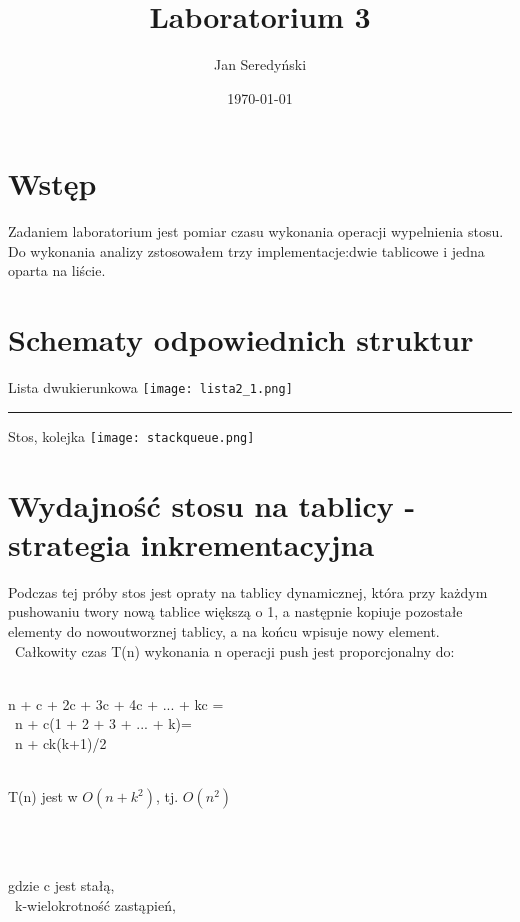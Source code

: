 \documentclass[11pt]{article}
\begin{document}
\title{Laboratorium 3}
\author{Jan Seredyński}
\date{\today}
\maketitle

\section{Wstęp}
Zadaniem laboratorium jest pomiar czasu wykonania operacji wypelnienia stosu. Do wykonania analizy zstosowałem trzy implementacje:dwie tablicowe i jedna oparta na liście.


\section{Schematy odpowiednich struktur}

Lista dwukierunkowa
\texttt{[image: lista2\_1.png]} 
\par\vspace{\baselineskip}
\hrule
\par\vspace{\baselineskip}
Stos, kolejka
\texttt{[image: stackqueue.png]} 
\newpage

\section{Wydajność stosu na tablicy - strategia inkrementacyjna}
Podczas tej próby stos jest opraty na tablicy dynamicznej, która przy każdym pushowaniu twory nową tablice większą o 1, a następnie kopiuje pozostałe elementy do nowoutworznej tablicy, a na końcu wpisuje nowy element.\\\
Całkowity czas T(n) wykonania n operacji push jest proporcjonalny do: \\\
\begin{center}
n + c + 2c + 3c + 4c + ... + kc =\\\
n + c(1 + 2 + 3 + ... + k)=\\\
n + ck(k+1)/2\\\

\begin{large} T(n) jest w $O(n+k^2)$, tj. $O(n^2)$ \end{large}\\\
\end{center}
gdzie c jest stałą,\\\
k-wielokrotność zastąpień,\\\
\end{document}
